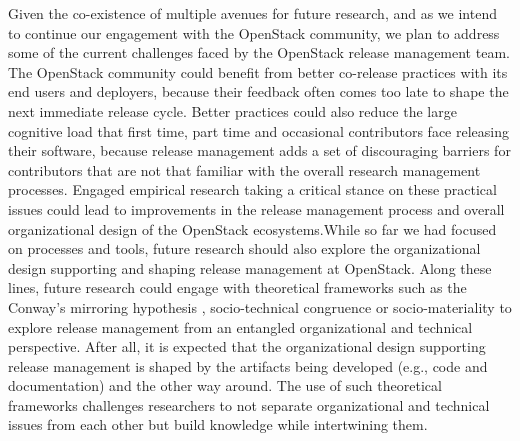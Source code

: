 \documentclass[dvipsnames]{interact}
\theoremstyle{plain}\newtheorem{theorem}{Theorem}[section]
\theoremstyle{definition}
\theoremstyle{remark}
\newenvironment{newStuff}{
    \begin{color}{Sepia}
    \begin{tabular}{|p{1.0\textwidth}|}
    \hline\\
    }
    { 
    \\\\\hline
    \end{tabular} 
    \end{color}
    }
\renewenvironment{newStuff}{}{}
\begin{document}
Given the co-existence of multiple avenues for future research, and as we intend to continue our engagement with the OpenStack community, we plan to address some of the current challenges faced by the OpenStack release management team. The OpenStack community could benefit from better co-release practices with its end users and deployers, because their feedback often comes too late to shape the next immediate release cycle. Better practices could also reduce the large cognitive load that first time, part time and occasional contributors face releasing their software, because release management adds a set of discouraging barriers for contributors that are not that familiar with the overall research management processes.  Engaged empirical research taking a critical stance on these practical issues could lead to improvements in the release management process and overall organizational design of the OpenStack ecosystems.\begin{newStuff}While so far we had focused on processes and tools, future research should also explore the organizational design supporting and shaping release management at OpenStack. Along these lines, future research could engage with theoretical frameworks such as the Conway's mirroring hypothesis \citep{KwanCataldo_et_al2012}, socio-technical congruence \citep{CataldoHerbsleb_et_al2008} or socio-materiality \citep{OrlikowskiScott2008} to explore release management from an entangled organizational and technical perspective. After all, it is expected that the organizational design supporting release management is shaped by the artifacts being developed (e.g., code and documentation) and the other way around. The use of such theoretical frameworks challenges researchers to not separate organizational and technical issues from each other but build knowledge while intertwining them.                                                                                                                                                                                                                                                                                                                                                                                                                                                                                                                                                                                                                                                                                                                                                                                                                                                                                                                                                                                                                                                                                                                                                                                                                                                                                                                                                                                                                                                                                                     
\end{document}
